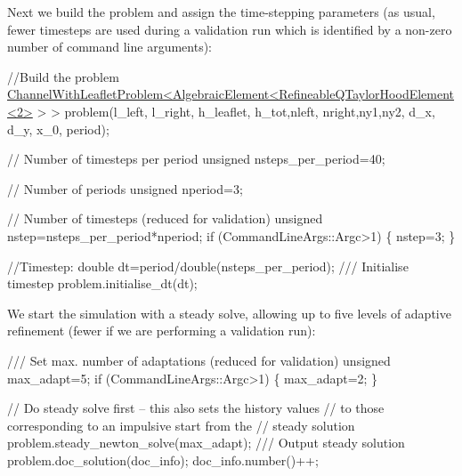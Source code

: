 Next we build the problem and assign the time-\/stepping parameters (as usual, fewer timesteps are used during a validation run which is identified by a non-\/zero number of command line arguments)\+:


\begin{DoxyCodeInclude}
 
 \textcolor{comment}{//Build the problem}
 \hyperlink{classChannelWithLeafletProblem}{ChannelWithLeafletProblem<AlgebraicElement<RefineableQTaylorHoodElement<2>}
       > >
  problem(l\_left, l\_right, h\_leaflet,
          h\_tot,nleft, nright,ny1,ny2,
          d\_x, d\_y, x\_0,
          period);
 
 
 \textcolor{comment}{// Number of timesteps per period}
 \textcolor{keywordtype}{unsigned} nsteps\_per\_period=40;

 \textcolor{comment}{// Number of periods}
 \textcolor{keywordtype}{unsigned} nperiod=3; 

 \textcolor{comment}{// Number of timesteps (reduced for validation)}
 \textcolor{keywordtype}{unsigned} nstep=nsteps\_per\_period*nperiod;
 \textcolor{keywordflow}{if} (CommandLineArgs::Argc>1)
  \{
   nstep=3;
  \}

 \textcolor{comment}{//Timestep: }
 \textcolor{keywordtype}{double} dt=period/double(nsteps\_per\_period);
 \textcolor{comment}{}
\textcolor{comment}{ /// Initialise timestep }
\textcolor{comment}{} problem.initialise\_dt(dt);

\end{DoxyCodeInclude}


We start the simulation with a steady solve, allowing up to five levels of adaptive refinement (fewer if we are performing a validation run)\+:


\begin{DoxyCodeInclude}

\textcolor{comment}{}
\textcolor{comment}{ /// Set max. number of adaptations (reduced for validation)}
\textcolor{comment}{} \textcolor{keywordtype}{unsigned} max\_adapt=5;
 \textcolor{keywordflow}{if} (CommandLineArgs::Argc>1)
  \{
   max\_adapt=2;
  \}

 \textcolor{comment}{// Do steady solve first -- this also sets the history values}
 \textcolor{comment}{// to those corresponding to an impulsive start from the}
 \textcolor{comment}{// steady solution}
 problem.steady\_newton\_solve(max\_adapt);
 \textcolor{comment}{}
\textcolor{comment}{ /// Output steady solution}
\textcolor{comment}{} problem.doc\_solution(doc\_info);
 doc\_info.number()++;

\end{DoxyCodeInclude}


